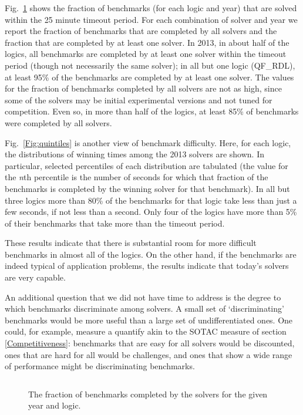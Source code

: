 \documentclass{eptcs}
\begin{document}
Fig.~\ref{Fig:completion} shows the fraction of benchmarks (for each logic and year) that are solved within the 25 minute timeout period. For each combination of solver and year we report the fraction of benchmarks that are completed by all solvers and the fraction that are completed by at least one solver. In 2013, in about half of the logics, all benchmarks are completed by at least one solver within the timeout period (though not necessarily the same solver); in all but one logic (QF\_RDL), at least 95\% of the benchmarks are completed by at least one solver. The values for the fraction of benchmarks completed by all solvers are not as high, since some of the solvers may be initial experimental versions and not tuned for competition. Even so, in more than half of the logics, at least 85\% of benchmarks were completed by all solvers.

Fig.~\ref{Fig:quintiles} is another view of benchmark difficulty. Here, for each logic, the distributions of winning times among the 2013 solvers are shown. In particular, selected
percentiles of each distribution are tabulated (the value for the {\em n}th percentile is the number of seconds for which that fraction of the benchmarks is completed by the winning solver for that benchmark). In all but three logics more than 80\% of the benchmarks for that logic take less than just a few seconds, if not less than a second. Only four of the logics have more than 5\% of their benchmarks that take more than the timeout period.
 
These results indicate that there is substantial room for more difficult benchmarks in almost all of the logics. On the other hand, if the benchmarks are indeed typical of application problems, the results indicate that today's solvers are very capable.

An additional question that we did not have time to address is the degree to which benchmarks discriminate among solvers. A small set of `discriminating' benchmarks would be more useful than a large set of undifferentiated ones. One could, for example, measure a quantify akin to the SOTAC measure of section \ref{Competitiveness}: benchmarks that are easy for all solvers would be discounted, ones that are hard for all would be challenges, and ones that show a wide range of performance might be discriminating benchmarks.
 

\begin{figure}
\centering
\begin{tabular}{|l|r|rrrr|rrrr|}
\hline

\end{tabular}
\caption{The fraction of benchmarks completed by the solvers for the given year and logic.}
\label{Fig:completion}
\end{figure}
\end{document}

